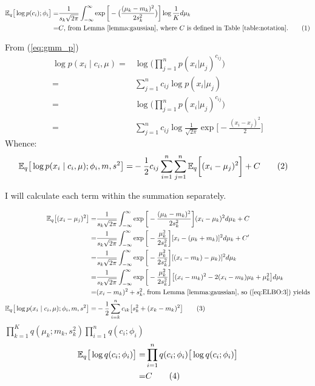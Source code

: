 \documentclass[]{article}
\newcommand{\Expectation} {\mathbb{E}}
\newcommand\numberthis    {\addtocounter{equation}{1}\tag{\theequation}}
\begin{document}
\begin{align*}
	\Expectation_q\big[\log{p(c_i);\phi_i}\big] =& \frac{1}{s_k\sqrt{2\pi}} \int_{-\infty}^{\infty} \exp{\bigg[-\big(\frac{(\mu_k-m_k)^2}{2 s_k^2}\big)\bigg]} \log{\frac{1}{K}} d \mu_k\\
	=& C  \text{, from Lemma \ref{lemma:gaussian}, where $C$ is defined in Table \ref{table:notation}.} \numberthis \label{eq:ELBO:2}
\end{align*}

From  (\ref{eq:gmm_p})
\begin{align*}
	\log{p(x_i\mid c_i,\mu)} =& \log{\big(\prod_{j=1}^{n} p(x_i|\mu_j)^{c_{ij}}\big)}\\
	=&\sum_{j=1}^{n}c_{ij} \log{p(x_i|\mu_j)}\\
	=& \log{\big(\prod_{j=1}^{n} p(x_i|\mu_j)^{c_{ij}}\big)}\\
	=&\sum_{j=1}^{n}c_{ij} \log{\frac{1}{\sqrt{2\pi}} \exp{\big[-\frac{(x_i-x_j)^2}{2}\big]}}
\end{align*}
Whence:
\begin{align*}
	\Expectation_q\big[\log{p(x_i\mid c_i,\mu);\phi_i,m,s^2}\big] =& - \frac{1}{2} c_{ij} \sum_{i=1}^{n} \sum_{j=1}^{n} \Expectation_q\bigg[ (x_i-\mu_j)^2\bigg] + C \numberthis \label{eq:ELBO:3}
\end{align*}

I will calculate each term within the summation separately.  

\begin{align*}
	\Expectation_q\big[(x_i-\mu_j)^2\big]
	=&\frac{1}{s_k\sqrt{2\pi}}  \int_{-\infty}^{\infty} \exp{\bigg[-\frac{(\mu_k-m_k)^2}{2 s_k^2}\bigg]}(x_i-\mu_k)^2 d \mu_k + C\\
	=&\frac{1}{s_k\sqrt{2\pi}}  \int_{-\infty}^{\infty} \exp{\bigg[-\frac{\mu_k^2}{2 s_k^2}\bigg]}[x_i-(\mu_k+m_k)]^2 d \mu_k + C^\prime \\
	=&\frac{1}{s_k\sqrt{2\pi}}  \int_{-\infty}^{\infty} \exp{\bigg[-\frac{\mu_k^2}{2 s_k^2}\bigg]}[(x_i-m_k)-\mu_k)]^2 d \mu_k\\
	=&\frac{1}{s_k\sqrt{2\pi}}  \int_{-\infty}^{\infty} \exp{\bigg[-\frac{\mu_k^2}{2 s_k^2}\bigg]}\big[(x_i-m_k)^2-2(x_i-m_k)\mu_k+\mu_k^2\big] d \mu_k\\
	=& (x_i-m_k)^2 + s_k^2 \text{, from Lemma \ref{lemma:gaussian}, so  (\ref{eq:ELBO:3}) yields}\\
	\Expectation_q\big[\log{p(x_i\mid c_i,\mu);\phi_i,m,s^2}\big] =&  -\frac{1}{2} \sum_{i=k}^{n} c_{ik} \big[s_k^2 + (x_k-m_k)^2 \big] \numberthis \label{eq:ELBO:3F}
\end{align*}
$\prod_{k=1}^{K} q(\mu_k;m_k,s_k^2) \prod_{i=1}^{n}q(c_i;\phi_i)$
\begin{align*}
	\Expectation_q\big[\log{q(c_i;\phi_i)}\big] =& \prod_{i=1}^{n}q(c_i;\phi_i) \big[\log{q(c_i;\phi_i)}\big]\\
	=& C \numberthis \label{eq:ELBO:4}
\end{align*}
\end{document}
